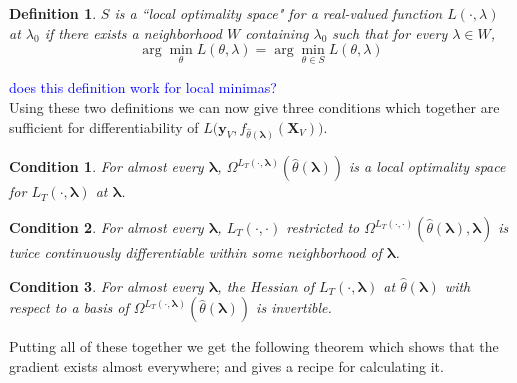 \documentclass[10pt,letterpaper]{article}
\newtheorem{definition}{Definition}
\newtheorem{condition}{Condition}
\begin{document}
\begin{definition}
$S$ is a ``local optimality space" for a real-valued function $L(\cdot, \lambda)$ at $\lambda_0$ if there exists a neighborhood $W$ containing $\lambda_0$ such that for every $\lambda \in W$,
\begin{equation}
\arg \min_\theta L(\theta, \lambda) = \arg \min_{\theta \in S} L(\theta, \lambda)
\end{equation}
\end{definition}
\textcolor{blue}{does this definition work for local minimas?}\\
Using these two definitions we can now give three conditions which together are sufficient for differentiability of $L \Big( \boldsymbol{y}_V, f_{\hat{\theta}(\boldsymbol{\lambda})}(\boldsymbol{X}_V) \Big )$.

\begin{condition}
For almost every $\boldsymbol{\lambda}$, $\Omega^{L_T(\cdot, \boldsymbol{\lambda})}(\hat{\theta}\left(\boldsymbol{\lambda}\right))$ is a local optimality space for $L_T\left(\cdot,\boldsymbol{\lambda}\right)$ at $\boldsymbol{\lambda}$.
\end{condition}

\begin{condition}
For almost every $\boldsymbol{\lambda}$, $L_T\left(\cdot, \cdot\right)$ restricted to $\Omega^{L_T(\cdot, \cdot)}(\hat{\theta}\left(\boldsymbol{\lambda}\right), \boldsymbol{\lambda})$ is twice continuously differentiable within some neighborhood of $\boldsymbol{\lambda}$.
\end{condition}

\begin{condition}
For almost every $\boldsymbol{\lambda}$, the Hessian of $L_T\left(\cdot, \boldsymbol{\lambda}\right)$ at $\hat{\theta}\left(\boldsymbol{\lambda}\right)$ with respect to a basis of $\Omega^{L_T(\cdot, \boldsymbol{\lambda})}(\hat{\theta}\left(\boldsymbol{\lambda}\right))$ is invertible.

\end{condition}

Putting all of these together we get the following theorem which shows that the gradient exists almost everywhere; and gives a recipe for calculating it.
\end{document}
